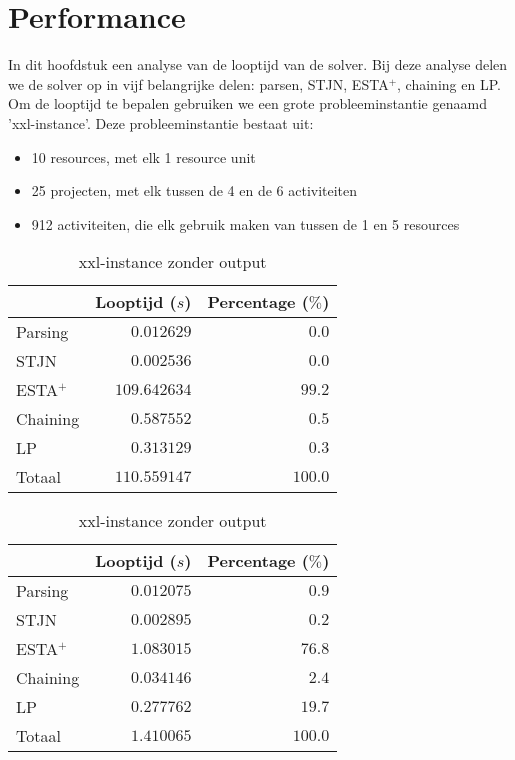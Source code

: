 \section{Performance}
In dit hoofdstuk een analyse van de looptijd van de solver. Bij deze analyse delen we de solver op in vijf belangrijke delen: parsen, STJN, ESTA$^+$, chaining en LP. Om de looptijd te bepalen gebruiken we een grote probleeminstantie genaamd 'xxl-instance'. Deze probleeminstantie bestaat uit:
\begin{itemize}
    \item 10 resources, met elk 1 resource unit
    \item 25 projecten, met elk tussen de 4 en de 6 activiteiten
    \item 912 activiteiten, die elk gebruik maken van tussen de 1 en 5 resources

\end{itemize}
\begin{table}[H]
\parbox{.45\linewidth}{
    \centering
    \label{tbl:xxl+output}
    \begin{tabular}{| l | r | r |}
        \hline
                    & Looptijd ($s$)& Percentage ($\%$) \\
        \hline
        Parsing     & $0.012629$      & $0.0$   \\
        STJN        & $0.002536$      & $0.0$   \\
        ESTA$^+$    & $109.642634$    & $99.2$  \\
        Chaining    & $0.587552$      & $0.5$   \\
        LP          & $0.313129$      & $0.3$   \\
        \hline \hline
        Totaal      & $110.559147$    & $100.0$ \\
        \hline
    \end{tabular}
    \caption{xxl-instance met output}
}
\hfill
\parbox{.45\linewidth}{
    \centering
    \label{tbl:xxl+output}
    \begin{tabular}{| l | r | r |}
        \hline
                    & Looptijd ($s$)& Percentage ($\%$) \\
        \hline
        Parsing     & $0.012075$      & $0.9$   \\
        STJN        & $0.002895$      & $0.2$   \\
        ESTA$^+$    & $1.083015$      & $76.8$  \\
        Chaining    & $0.034146$      & $2.4$   \\
        LP          & $0.277762$      & $19.7$  \\
        \hline \hline
        Totaal      & $1.410065$      & $100.0$ \\
        \hline
    \end{tabular}
    \caption{xxl-instance zonder output}
}
\end{table}
